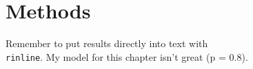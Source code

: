 \section{Methods}

Remember to put results directly into text with \texttt{\\rinline}.
My model for this chapter isn't great (p = 0.8).

